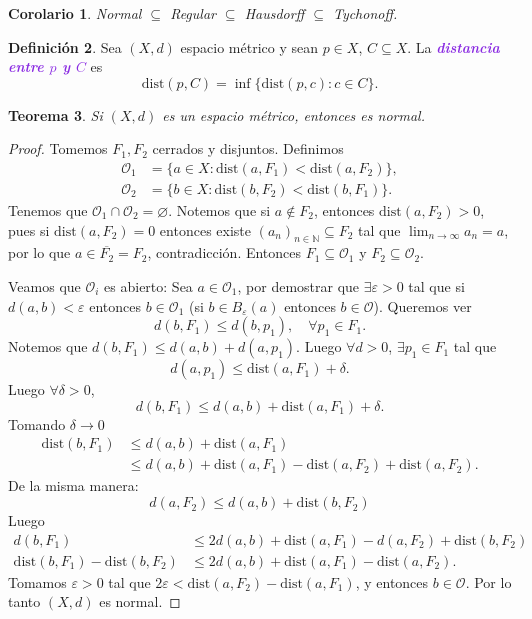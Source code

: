 \documentclass{article}
\newtheorem{theorem}{Teorema}[section]
\newtheorem{corollary}[theorem]{Corolario}
\theoremstyle{definition}
\newtheorem{definition}[theorem]{Definición}
\theoremstyle{remark}
\numberwithin{equation}{section}
\newcommand{\N}{\mathbb{N}}
\renewcommand{\O}{\mathcal{O}}
\renewcommand{\d}{\delta}
\newcommand{\e}{\varepsilon}
\newcommand{\oo}{\infty}
\renewcommand{\bar}{\overline}
\newcommand{\dist}{\mathrm{dist}}
\newcommand{\wea}[1]{\textcolor{BlueViolet}{\textbf{\emph{#1}}}}
\begin{document}
\begin{corollary}
  Normal $\subseteq$ Regular $\subseteq$ Hausdorff $\subseteq$ Tychonoff.
\end{corollary}

\begin{definition}
  Sea $(X,d)$ espacio métrico y sean $p \in X$, $C \subseteq X$. La \wea{distancia entre $p$ y $C$} es
  \[\dist(p,C) = \inf\{\dist(p,c) \colon c \in C\}.\]
\end{definition}

\begin{theorem}
  Si $(X,d)$ es un espacio métrico, entonces es normal.
\end{theorem}
\begin{proof}
  Tomemos $F_1,F_2$ cerrados y disjuntos. Definimos
  \begin{align*}
    \O_1 &= \{a \in X \colon \dist(a,F_1) < \dist(a,F_2)\}, \\
    \O_2 &= \{b \in X \colon \dist(b,F_2) < \dist(b,F_1)\}.
  \end{align*}
  Tenemos que $\O_1 \cap \O_2 = \varnothing$. Notemos que si $a \notin F_2$, entonces $\dist(a,F_2)>0$, pues si $\dist(a,F_2) = 0$ entonces existe $(a_n)_{n\in\N} \subseteq F_2$ tal que $\lim_{n\to\oo} a_n = a$, por lo que $a \in \bar{F_2} = F_2$, contradicción. Entonces $F_1 \subseteq \O_1$ y $F_2 \subseteq \O_2$.

  Veamos que $\O_i$ es abierto:
  Sea $a \in \O_1$, por demostrar que $\exists \e>0$ tal que si $d(a,b) < \e$ entonces $b \in \O_1$ (si $b \in B_\e(a)$ entonces $b \in \O$).
  Queremos ver
  \[d(b,F_1) \leq d(b,p_1), \quad \forall p_1 \in F_1.\]
  Notemos que $d(b,F_1) \leq d(a,b) + d(a,p_1)$. Luego $\forall d >0$, $\exists p_1 \in F_1$ tal que
  \[d(a,p_1) \leq \dist(a,F_1) + \d.\]
  Luego $\forall \d>0$,
  \[d(b,F_1) \leq d(a,b) + \dist(a,F_1) + \d.\]
  Tomando $\d \to 0$
  \begin{align*}
    \dist(b,F_1) &\leq d(a,b) + \dist(a,F_1) \\
    &\leq d(a,b) + \dist(a,F_1) - \dist(a,F_2) + \dist(a,F_2).
  \end{align*}
  De la misma manera:
  \[d(a,F_2) \leq d(a,b) + \dist(b,F_2)\]
  Luego
  \begin{align*}
    d(b,F_1) &\leq 2d(a,b) + \dist(a,F_1) - d(a,F_2) + \dist(b,F_2) \\
    \dist(b,F_1) - \dist(b,F_2) &\leq 2d(a,b) + \dist(a,F_1) - \dist(a,F_2).
  \end{align*}
  Tomamos $\e>0$ tal que $2\e < \dist(a,F_2) - \dist(a,F_1)$, y entonces $b \in \O$. Por lo tanto $(X,d)$ es normal.
\end{proof}
\end{document}
